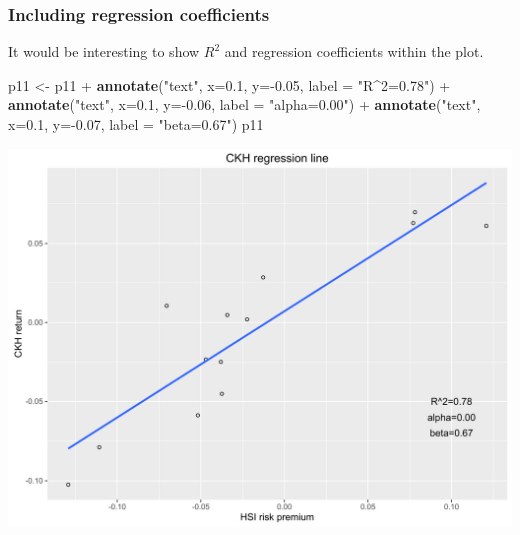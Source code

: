 \documentclass[]{article}
\newenvironment{Shaded}{\begin{snugshade}}{\end{snugshade}}
\newcommand{\KeywordTok}[1]{\textcolor[rgb]{0.13,0.29,0.53}{\textbf{{#1}}}}
\newcommand{\DataTypeTok}[1]{\textcolor[rgb]{0.13,0.29,0.53}{{#1}}}
\newcommand{\FloatTok}[1]{\textcolor[rgb]{0.00,0.00,0.81}{{#1}}}
\newcommand{\StringTok}[1]{\textcolor[rgb]{0.31,0.60,0.02}{{#1}}}
\newcommand{\NormalTok}[1]{{#1}}
\begin{document}
\subsubsection{Including regression
coefficients}\label{including-regression-coefficients}

It would be interesting to show \(R^2\) and regression coefficients
within the plot.

\begin{Shaded}
\begin{Highlighting}[]
\NormalTok{p11 <-}\StringTok{ }\NormalTok{p11 +}\StringTok{ }\KeywordTok{annotate}\NormalTok{(}\StringTok{"text"}\NormalTok{, }\DataTypeTok{x=}\FloatTok{0.1}\NormalTok{, }\DataTypeTok{y=}\NormalTok{-}\FloatTok{0.05}\NormalTok{, }\DataTypeTok{label =} \StringTok{"R^2=0.78"}\NormalTok{) +}\StringTok{ }
\StringTok{      }\KeywordTok{annotate}\NormalTok{(}\StringTok{"text"}\NormalTok{, }\DataTypeTok{x=}\FloatTok{0.1}\NormalTok{, }\DataTypeTok{y=}\NormalTok{-}\FloatTok{0.06}\NormalTok{, }\DataTypeTok{label =} \StringTok{"alpha=0.00"}\NormalTok{) +}\StringTok{ }
\StringTok{      }\KeywordTok{annotate}\NormalTok{(}\StringTok{"text"}\NormalTok{, }\DataTypeTok{x=}\FloatTok{0.1}\NormalTok{, }\DataTypeTok{y=}\NormalTok{-}\FloatTok{0.07}\NormalTok{, }\DataTypeTok{label =} \StringTok{"beta=0.67"}\NormalTok{)}
\NormalTok{p11}
\end{Highlighting}
\end{Shaded}

\begin{center}\includegraphics{0_all_posts_pdf/lr_10-1} \end{center}
\end{document}

